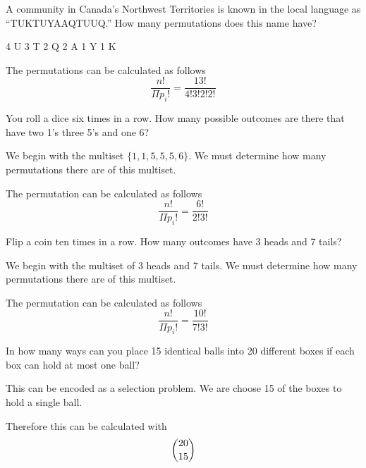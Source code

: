 \documentclass[openany, 11pt]{book}
\begin{document}
\begin{exercise}{}{}
	A community in Canada's Northwest Territories is known in the local language
	as “TUKTUYAAQTUUQ.” How many permutations does this name have?
	\begin{alist}
		\item
		4 U
		3 T
		2 Q
		2 A
		1 Y
		1 K
		\item The permutations can be calculated as follows $$
			\dfrac{n!}{\Pi{p_i}!} = \dfrac{13!}{4!3!2!2!}$$
	\end{alist}
\end{exercise}

\begin{exercise}{}{}
	You roll a dice six times in a row. How many possible outcomes are there
	that have two 1's three 5's and one 6?
	\begin{alist}
		\item We begin with the multiset $\{1, 1, 5, 5, 5, 6\}$. We must determine how
		many permutations there are of this multiset.
		\item The permutation can be calculated as follows
		$$ \dfrac{n!}{\Pi{p_i}!} = \dfrac{6!}{2!3!}$$
	\end{alist}
\end{exercise}

\begin{exercise}{}{}
	Flip a coin ten times in a row. How many outcomes have 3 heads and 7 tails?
	\begin{alist}
		\item We begin with the multiset of 3 heads and 7 tails. We must determine how
		many permutations there are of this multiset.
		\item The permutation can be calculated as follows
		$$ \dfrac{n!}{\Pi{p_i}!} = \dfrac{10!}{7!3!}$$
	\end{alist}
\end{exercise}

\begin{exercise}{}{}
	In how many ways can you place 15 identical balls into 20
	different boxes if each box can hold at most one ball?
	\begin{alist}
		\item This can be encoded as a selection problem. We are choose 15 of the boxes
		to hold a single ball.
		\item Therefore this can be calculated with
		$$ \dbinom{20}{15}$$
	\end{alist}
\end{exercise}
\end{document}

